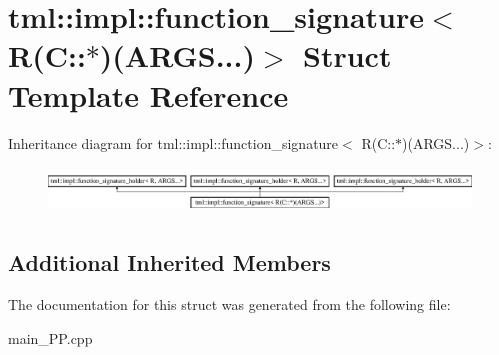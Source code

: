 \hypertarget{structtml_1_1impl_1_1function__signature_3_01R_07C_1_1_5_08_07ARGS_8_8_8_08_4}{\section{tml\+:\+:impl\+:\+:function\+\_\+signature$<$ R(C\+:\+:$\ast$)(A\+R\+G\+S...)$>$ Struct Template Reference}
\label{structtml_1_1impl_1_1function__signature_3_01R_07C_1_1_5_08_07ARGS_8_8_8_08_4}
}
Inheritance diagram for tml\+:\+:impl\+:\+:function\+\_\+signature$<$ R(C\+:\+:$\ast$)(A\+R\+G\+S...)$>$\+:\begin{figure}[H]
\begin{center}
\leavevmode
\includegraphics[height=1.252796cm]{structtml_1_1impl_1_1function__signature_3_01R_07C_1_1_5_08_07ARGS_8_8_8_08_4}
\end{center}
\end{figure}
\subsection*{Additional Inherited Members}


The documentation for this struct was generated from the following file\+:\begin{DoxyCompactItemize}
\item 
main\+\_\+\+P\+P.\+cpp\end{DoxyCompactItemize}
